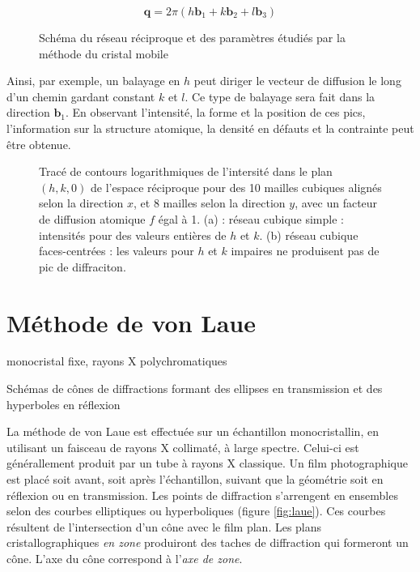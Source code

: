 \begin{equation}
    \mathbf{q} = 2\pi (h\mathbf{b}_1 + k\mathbf{b}_2 + l\mathbf{b}_3)
\end{equation}

\begin{figure}
    \TODO
    \caption{Schéma du réseau réciproque et des paramètres étudiés par la méthode du cristal mobile}
    \label{fig:cristalmobilerecip}
\end{figure}

Ainsi, par exemple, un balayage en $h$ peut diriger le vecteur de diffusion le long d'un chemin gardant constant $k$ et $l$. Ce type de balayage sera fait dans la direction $\mathbf{b}_1$. En observant l'intensité, la forme et la position de ces pics, l'information sur la structure atomique, la densité en défauts et la contrainte peut être obtenue.

\begin{figure}
    \TODO
    \caption{Tracé de contours logarithmiques de l'intersité dans le plan $(h,k,0)$ de l'espace réciproque pour des 10 mailles cubiques alignés selon la direction $x$, et 8 mailles selon la direction $y$, avec un facteur de diffusion atomique $f$ égal à 1. (a) : réseau cubique simple : intensités pour des valeurs entières de $h$ et $k$. (b) réseau cubique faces-centrées : les valeurs pour $h$ et $k$ impaires ne produisent pas de pic de diffraciton.}
    \label{fig:cristalmobilecubic}
\end{figure}

\section{Méthode de von Laue}
monocristal fixe, rayons X polychromatiques

\begin{marginfigure}
    \TODO
    \caption{Schémas de cônes de diffractions formant des ellipses en transmission et des hyperboles en réflexion}
    \label{fig:laue}
\end{marginfigure}


La méthode de von Laue est effectuée sur un échantillon monocristallin, en utilisant un faisceau de rayons X collimaté, à large spectre. Celui-ci est générallement produit par un tube à rayons X classique. Un film photographique est placé soit avant, soit après l'échantillon, suivant que la géométrie soit en réflexion ou en transmission. Les points de diffraction s'arrengent en ensembles selon des courbes elliptiques ou hyperboliques (figure \ref{fig:laue}). Ces courbes résultent de l'intersection d'un cône avec le film plan. Les plans cristallographiques \emph{en zone} produiront des taches de diffraction qui formeront un cône. L'axe du cône correspond à l'\emph{axe de zone}.

